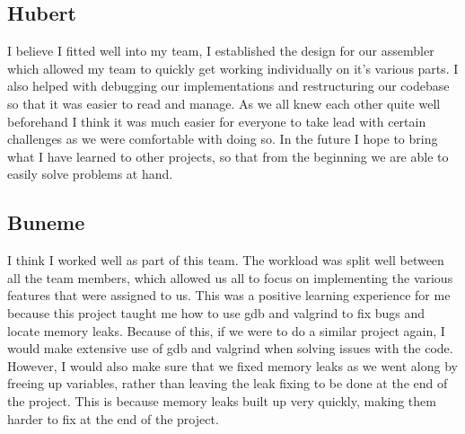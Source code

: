 \documentclass[a4paper]{article}
\begin{document}
\subsection{Hubert}
I believe I fitted well into my team, I established the design for our assembler which allowed my team to quickly get working individually on it’s various parts. I also helped with debugging our implementations and restructuring our codebase so that it was easier to read and manage. As we all knew each other quite well beforehand I think it was much easier for everyone to take lead with certain challenges as we were comfortable with doing so. In the future I hope to bring what I have learned to other projects, so that from the beginning we are able to easily solve problems at hand.
\subsection{Buneme}
I think I worked well as part of this team. The workload was split well between all the team members, which allowed us all to focus on implementing the various features that were assigned to us. This was a positive learning experience for me because this project taught me how to use gdb and valgrind to fix bugs and locate memory leaks. Because of this, if we were to do a similar project again, I would make extensive use of gdb and valgrind when solving issues with the code. However, I would also make sure that we fixed memory leaks as we went along by freeing up variables, rather than leaving the leak fixing to be done at the end of the project. This is because memory leaks built up very quickly, making them harder to fix at the end of the project.
\end{document}

